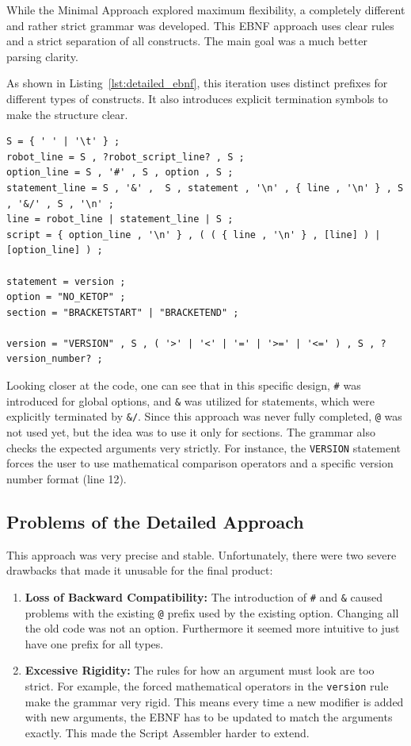 While the Minimal Approach explored maximum flexibility, a completely different and rather strict grammar was developed. This EBNF approach uses clear rules and a strict separation of all constructs. The main goal was a much better parsing clarity.

As shown in Listing~\ref{lst:detailed_ebnf},  this iteration uses distinct prefixes for different types of constructs. It also introduces explicit termination symbols to make the structure clear.

\begin{lstlisting}[caption={The Detailed EBNF grammar}, label={lst:detailed_ebnf}, float=htbp]
S = { ' ' | '\t' } ;
robot_line = S , ?robot_script_line? , S ;
option_line = S , '#' , S , option , S ;
statement_line = S , '&' ,  S , statement , '\n' , { line , '\n' } , S , '&/' , S , '\n' ;
line = robot_line | statement_line | S ;
script = { option_line , '\n' } , ( ( { line , '\n' } , [line] ) | [option_line] ) ;

statement = version ;
option = "NO_KETOP" ;
section = "BRACKETSTART" | "BRACKETEND" ;

version = "VERSION" , S , ( '>' | '<' | '=' | '>=' | '<=' ) , S , ?version_number? ;
\end{lstlisting}


Looking closer at the code, one can see that in this specific design, \texttt{\#} was introduced for global options, and \texttt{\&} was utilized for statements, which were explicitly terminated by \texttt{\&/}. Since this approach was never fully completed, \texttt{@} was not used yet, but the idea was to use it only for sections. The grammar also checks the expected arguments very strictly. For instance, the \texttt{VERSION} statement forces the user to use mathematical comparison operators and a specific version number format (line 12).

\subsection{Problems of the Detailed Approach}

This approach was very precise and stable. Unfortunately, there were two severe drawbacks that made it unusable for the final product:
\begin{enumerate}
    \item \textbf{Loss of Backward Compatibility:} The introduction of \texttt{\#} and \texttt{\&} caused problems with the existing \texttt{@} prefix used by the existing option. Changing all the old code was not an option. Furthermore it seemed more intuitive to just have one prefix for all types.
    \item \textbf{Excessive Rigidity:} The rules for how an argument must look are too strict. For example, the forced mathematical operators in the \texttt{version} rule make the grammar very rigid. This means every time a new modifier is added with new arguments, the EBNF has to be updated to match the arguments exactly. This made the Script Assembler harder to extend.
\end{enumerate}

